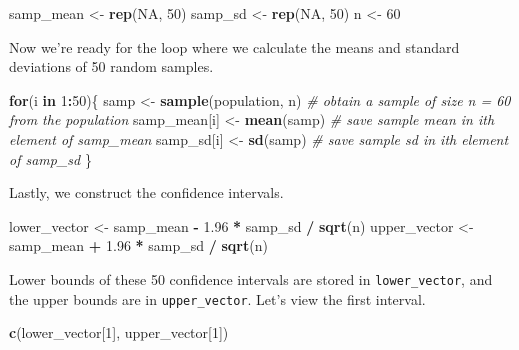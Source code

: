 \documentclass[]{article}
\newenvironment{Shaded}{\begin{snugshade}}{\end{snugshade}}
\newcommand{\KeywordTok}[1]{\textcolor[rgb]{0.13,0.29,0.53}{\textbf{#1}}}
\newcommand{\DecValTok}[1]{\textcolor[rgb]{0.00,0.00,0.81}{#1}}
\newcommand{\FloatTok}[1]{\textcolor[rgb]{0.00,0.00,0.81}{#1}}
\newcommand{\StringTok}[1]{\textcolor[rgb]{0.31,0.60,0.02}{#1}}
\newcommand{\CommentTok}[1]{\textcolor[rgb]{0.56,0.35,0.01}{\textit{#1}}}
\newcommand{\OtherTok}[1]{\textcolor[rgb]{0.56,0.35,0.01}{#1}}
\newcommand{\ControlFlowTok}[1]{\textcolor[rgb]{0.13,0.29,0.53}{\textbf{#1}}}
\newcommand{\OperatorTok}[1]{\textcolor[rgb]{0.81,0.36,0.00}{\textbf{#1}}}
\newcommand{\NormalTok}[1]{#1}
\begin{document}
\begin{Shaded}
\begin{Highlighting}[]
\NormalTok{samp_mean <-}\StringTok{ }\KeywordTok{rep}\NormalTok{(}\OtherTok{NA}\NormalTok{, }\DecValTok{50}\NormalTok{)}
\NormalTok{samp_sd <-}\StringTok{ }\KeywordTok{rep}\NormalTok{(}\OtherTok{NA}\NormalTok{, }\DecValTok{50}\NormalTok{)}
\NormalTok{n <-}\StringTok{ }\DecValTok{60}
\end{Highlighting}
\end{Shaded}

Now we're ready for the loop where we calculate the means and standard
deviations of 50 random samples.

\begin{Shaded}
\begin{Highlighting}[]
\ControlFlowTok{for}\NormalTok{(i }\ControlFlowTok{in} \DecValTok{1}\OperatorTok{:}\DecValTok{50}\NormalTok{)\{}
\NormalTok{  samp <-}\StringTok{ }\KeywordTok{sample}\NormalTok{(population, n) }\CommentTok{# obtain a sample of size n = 60 from the population}
\NormalTok{  samp_mean[i] <-}\StringTok{ }\KeywordTok{mean}\NormalTok{(samp)    }\CommentTok{# save sample mean in ith element of samp_mean}
\NormalTok{  samp_sd[i] <-}\StringTok{ }\KeywordTok{sd}\NormalTok{(samp)        }\CommentTok{# save sample sd in ith element of samp_sd}
\NormalTok{\}}
\end{Highlighting}
\end{Shaded}

Lastly, we construct the confidence intervals.

\begin{Shaded}
\begin{Highlighting}[]
\NormalTok{lower_vector <-}\StringTok{ }\NormalTok{samp_mean }\OperatorTok{-}\StringTok{ }\FloatTok{1.96} \OperatorTok{*}\StringTok{ }\NormalTok{samp_sd }\OperatorTok{/}\StringTok{ }\KeywordTok{sqrt}\NormalTok{(n) }
\NormalTok{upper_vector <-}\StringTok{ }\NormalTok{samp_mean }\OperatorTok{+}\StringTok{ }\FloatTok{1.96} \OperatorTok{*}\StringTok{ }\NormalTok{samp_sd }\OperatorTok{/}\StringTok{ }\KeywordTok{sqrt}\NormalTok{(n)}
\end{Highlighting}
\end{Shaded}

Lower bounds of these 50 confidence intervals are stored in
\texttt{lower\_vector}, and the upper bounds are in
\texttt{upper\_vector}. Let's view the first interval.

\begin{Shaded}
\begin{Highlighting}[]
\KeywordTok{c}\NormalTok{(lower_vector[}\DecValTok{1}\NormalTok{], upper_vector[}\DecValTok{1}\NormalTok{])}
\end{Highlighting}
\end{Shaded}
\end{document}
